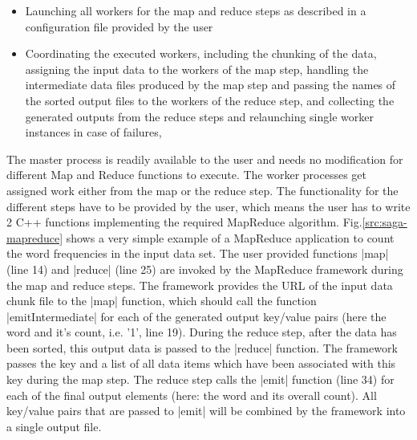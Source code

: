 \documentclass[conference,final]{IEEEtran}
\begin{document}
\begin{itemize}
\item Launching all workers for the map and reduce steps as described
  in a configuration file provided by the user 
\item Coordinating the executed workers, including the chunking of the
  data, assigning the input data to the workers of the map step,
  handling the intermediate data files produced by the map step and
  passing the names of the sorted output files to the workers of the
  reduce step, and collecting the generated outputs from the reduce
  steps and relaunching single worker instances in case of failures,
\end{itemize}

The master process is readily available to the user and needs no
modification for different Map and Reduce functions to execute.  The
worker processes get assigned work either from the map or the reduce
step. The functionality for the different steps have to be provided by
the user, which means the user has to write 2 C++ functions
implementing the required MapReduce algorithm.
Fig.\ref{src:saga-mapreduce} shows a very simple example of a
MapReduce application to count the word frequencies in the input data
set. The user provided functions |map| (line 14) and |reduce| (line
25) are invoked by the MapReduce framework during the map and reduce
steps. The framework provides the URL of the input data chunk file to
the |map| function, which should call the function |emitIntermediate|
for each of the generated output key/value pairs (here the word and
it's count, i.e. '1', line 19). During the reduce step, after the data
has been sorted, this output data is passed to the |reduce|
function. The framework passes the key and a list of all data items
which have been associated with this key during the map step. The
reduce step calls the |emit| function (line 34) for each of the final
output elements (here: the word and its overall count). All key/value
pairs that are passed to |emit| will be combined by the framework into
a single output file.
\end{document}
